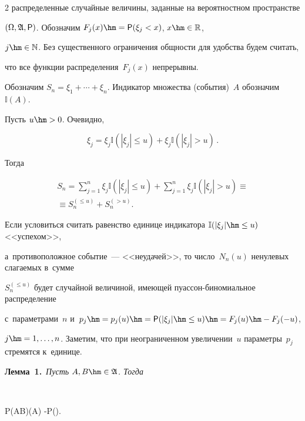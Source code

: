 \begin{multicols}{2}
распределенные случайные величины, заданные на вероятностном пространстве 

$(\Omega,\mathfrak{A},{\sf P})$. Обозначим $F_j(x)\hm={\sf P}(\xi_j<x)$, $x\hm\in\mathbb{R}$, 

$j\hm\in\mathbb{N}$. Без существенного ограничения общ\-ности для удобства будем считать, 

что все функции распределения~$F_j(x)$ непрерывны.



Обозначим $S_n=\xi_1+\cdots+\xi_n$. Индикатор множества (события)~$A$ обозначим $\mathbb{I}(A)$. 

Пусть $u\hm>0$. Очевидно, 

$$

\xi_j=\xi_j\mathbb{I}\left(|\xi_j|\le u\right)+\xi_j\mathbb{I}\left(|\xi_j|> u\right)\,.

$$

 Тогда

\begin{multline*}

S_n=\sum\limits_{j=1}^n \xi_j\mathbb{I}(|\xi_j|\le u)+\sum\limits_{j=1}^n \xi_j\mathbb{I}(|\xi_j|> u)\equiv{}\\

{}\equiv

S_n^{(\le u)}+S_n^{(> u)}.

\end{multline*}

Если условиться считать равенство единице индикатора $\mathbb{I}(|\xi_j|\hm\le u)$ <<успехом>>, 

а~противоположное событие~--- <<неудачей>>, то число~$N_n(u)$ ненулевых слагаемых в~сумме 

$S_n^{(\le u)}$ будет случайной величиной, имеющей пуас\-сон-би\-но\-ми\-аль\-ное распределение 

с~па\-ра\-мет\-ра\-ми~$n$ и~$p_j\hm=p_j(u)\hm={\sf P}(|\xi_j|\hm\le u)\hm=F_j(u)\hm-F_j(-u)$, 

$j\hm=1,\ldots,n$. Заметим, что при неограниченном увеличении~$u$ параметры~$p_j$ стремятся к~единице.



\smallskip



\noindent

\textbf{Лемма~1.}\ \textit{Пусть $A,B\hm\in\mathfrak{A}$. Тогда} 

$$

{\sf P}(A\bigcap B)(A) -{\sf P}\left(\right).


\end{multicols}

